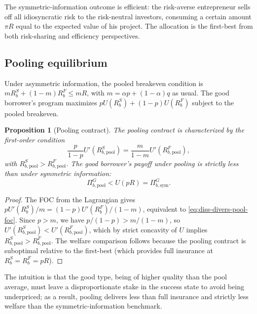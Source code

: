 \documentclass[11pt,a4paper,oneside]{book}
\def\leq{\leqslant}
\theoremstyle{plain}
\newtheorem{proposition}[theorem]{Proposition}
\theoremstyle{definition}
\theoremstyle{remark}
\numberwithin{equation}{chapter}
\begin{document}
The symmetric-information outcome is efficient: the risk-averse entrepreneur sells off all idiosyncratic risk to the risk-neutral investors, consuming a certain amount $\pi R$ equal to the expected value of his project.
The allocation is the first-best from both risk-sharing and efficiency perspectives.

\subsection{Pooling equilibrium}

Under asymmetric information, the pooled breakeven condition is $m R_b^S + (1 - m) R_b^F \leq mR$, with $m = \alpha p + (1 - \alpha) q$ as usual.
The good borrower's program maximizes $p U(R_b^S) + (1 - p) U(R_b^F)$ subject to the pooled breakeven.

\begin{proposition}[Pooling contract]\label{prop:diss-divers-pool}
The pooling contract is characterized by the first-order condition
\begin{equation}\label{eq:diss-divers-pool-foc}
  \frac{p}{1 - p} U'(R_{b, \text{pool}}^S) = \frac{m}{1 - m} U'(R_{b, \text{pool}}^F),
\end{equation}
with $R_{b, \text{pool}}^S > R_{b, \text{pool}}^F$.
The good borrower's payoff under pooling is strictly less than under symmetric information:
\begin{equation*}
  \Pi_{b, \text{pool}}^{G} < U(pR) = \Pi_{b, \text{sym}}^{G}.
\end{equation*}
\end{proposition}

\begin{proof}
The FOC from the Lagrangian gives $p U'(R_b^S)/m = (1-p) U'(R_b^F)/(1-m)$, equivalent to \eqref{eq:diss-divers-pool-foc}.
Since $p > m$, we have $p/(1-p) > m/(1-m)$, so $U'(R_{b, \text{pool}}^S) < U'(R_{b, \text{pool}}^F)$, which by strict concavity of $U$ implies $R_{b, \text{pool}}^S > R_{b, \text{pool}}^F$.
The welfare comparison follows because the pooling contract is suboptimal relative to the first-best (which provides full insurance at $R_b^S = R_b^F = pR$).
\end{proof}

The intuition is that the good type, being of higher quality than the pool average, must leave a disproportionate stake in the success state to avoid being underpriced; as a result, pooling delivers less than full insurance and strictly less welfare than the symmetric-information benchmark.
\end{document}
